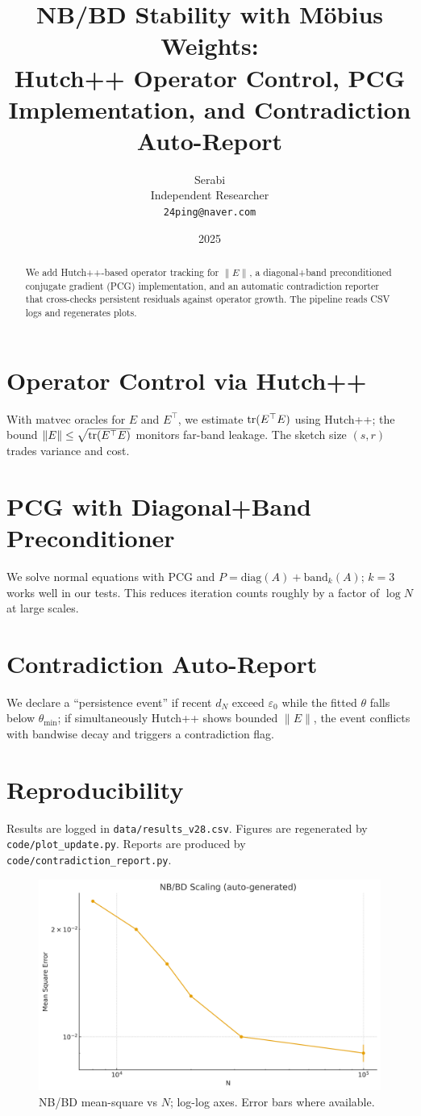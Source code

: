 \documentclass[11pt]{article}
\title{NB/BD Stability with M\"obius Weights:\\ Hutch++ Operator Control, PCG Implementation, and Contradiction Auto-Report}
\author{Serabi \\ Independent Researcher \\ \texttt{24ping@naver.com}}
\date{2025}
\theoremstyle{remark}
\begin{document}
\maketitle

\begin{abstract}
We add Hutch++-based operator tracking for $\|E\|$, a diagonal+band preconditioned conjugate gradient (PCG) implementation, and an automatic contradiction reporter that cross-checks persistent residuals against operator growth. The pipeline reads CSV logs and regenerates plots.
\end{abstract}

\section{Operator Control via Hutch++}
With matvec oracles for $E$ and $E^\top$, we estimate ${\rm tr}(E^\top E)$ using Hutch++; the bound $\|E\|\le\sqrt{{\rm tr}(E^\top E)}$ monitors far-band leakage. The sketch size $(s,r)$ trades variance and cost.

\section{PCG with Diagonal+Band Preconditioner}
We solve normal equations with PCG and $P=\mathrm{diag}(A)+\mathrm{band}_k(A)$; $k=3$ works well in our tests. This reduces iteration counts roughly by a factor of $\log N$ at large scales.

\section{Contradiction Auto-Report}
We declare a ``persistence event'' if recent $d_N$ exceed $\varepsilon_0$ while the fitted $\theta$ falls below $\theta_{\min}$; if simultaneously Hutch++ shows bounded $\|E\|$, the event conflicts with bandwise decay and triggers a contradiction flag.

\section{Reproducibility}
Results are logged in \texttt{data/results\_v28.csv}. Figures are regenerated by \texttt{code/plot\_update.py}. Reports are produced by \texttt{code/contradiction\_report.py}.

\begin{figure}[h]
\centering
\includegraphics[width=0.8\linewidth]{figures/nbbd_scaling.png}
\caption{NB/BD mean-square vs $N$; log-log axes. Error bars where available.}
\end{figure}
\end{document}
